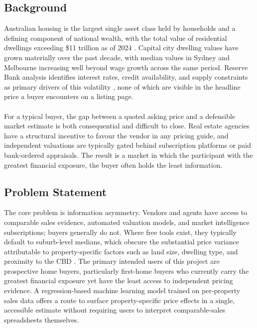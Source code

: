 \documentclass[a4paper,12pt]{article}
\begin{document}
\subsection{Background}
Australian housing is the largest single asset class held by households and a defining component of national wealth, with the total value of residential dwellings exceeding \$11 trillion as of 2024 \cite{abs2024housing}. Capital city dwelling values have grown materially over the past decade, with median values in Sydney and Melbourne increasing well beyond wage growth across the same period. Reserve Bank analysis identifies interest rates, credit availability, and supply constraints as primary drivers of this volatility \cite{kearns2022rba}, none of which are visible in the headline price a buyer encounters on a listing page. 
\\
\\
For a typical buyer, the gap between a quoted asking price and a defensible market estimate is both consequential and difficult to close. Real estate agencies have a structural incentive to favour the vendor in any pricing guide, and independent valuations are typically gated behind subscription platforms or paid bank-ordered appraisals. The result is a market in which the participant with the greatest financial exposure, the buyer often holds the least information. 

\subsection{Problem Statement}
The core problem is information asymmetry. Vendors and agents have access to comparable sales evidence, automated valuation models, and market intelligence subscriptions; buyers generally do not. Where free tools exist, they typically default to suburb-level medians, which obscure the substantial price variance attributable to property-specific factors such as land size, dwelling type, and proximity to the CBD \cite{sirmans2005hedonic}. The primary intended users of this project are prospective home buyers, particularly first-home buyers who currently carry the greatest financial exposure yet have the least access to independent pricing evidence. A regression-based machine learning model trained on per-property sales data offers a route to surface property-specific price effects in a single, accessible estimate without requiring users to interpret comparable-sales spreadsheets themselves. 
\end{document}
